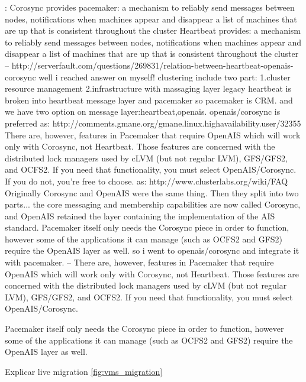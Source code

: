 \cite{clusterlabs}:
Corosync provides pacemaker:
a mechanism to reliably send messages between nodes,
notifications when machines appear and disappear
a list of machines that are up that is consistent throughout the cluster 
Heartbeat provides:
a mechanism to reliably send messages between nodes,
notifications when machines appear and disappear
a list of machines that are up that is consistent throughout the cluster 
--
http://serverfault.com/questions/269831/relation-between-heartbeat-openais-corosync
well i reached answer on myself! clustering include two part:
1.cluster resource management
2.infrastructure with massaging layer
legacy heartbeat is broken into heartbeat message layer and pacemaker so pacemaker is CRM.
and we have two option on message layer:heartbeat,openais. openais/corosync is preferred as: http://comments.gmane.org/gmane.linux.highavailability.user/32355
There are, however, features in Pacemaker that require OpenAIS which will work only with Corosync, not Heartbeat. Those features are concerned 
with the distributed lock managers used by cLVM (but not regular LVM), GFS/GFS2, and OCFS2. If you need that functionality, you must select 
OpenAIS/Corosync. If you do not, you're free to choose.
as: http://www.clusterlabs.org/wiki/FAQ
Originally Corosync and OpenAIS were the same thing. Then they split into two parts... the core messaging and membership capabilities are now 
called Corosync, and OpenAIS retained the layer containing the implementation of the AIS standard.
Pacemaker itself only needs the Corosync piece in order to function, however some of the applications it can manage (such as OCFS2 and GFS2) 
require the OpenAIS layer as well.
so i went to openais/corosync and integrate it with pacemaker.
--
There are, however, features in Pacemaker that require OpenAIS which
will work only with Corosync, not Heartbeat. Those features are
concerned with the distributed lock managers used by cLVM (but not
regular LVM), GFS/GFS2, and OCFS2. If you need that functionality, you
must select OpenAIS/Corosync.

Pacemaker itself only needs the Corosync piece in order to function, however some of the applications it can manage 
(such as OCFS2 and GFS2) require the OpenAIS layer as well. 


Explicar live migration \ref{fig:vms_migration}

